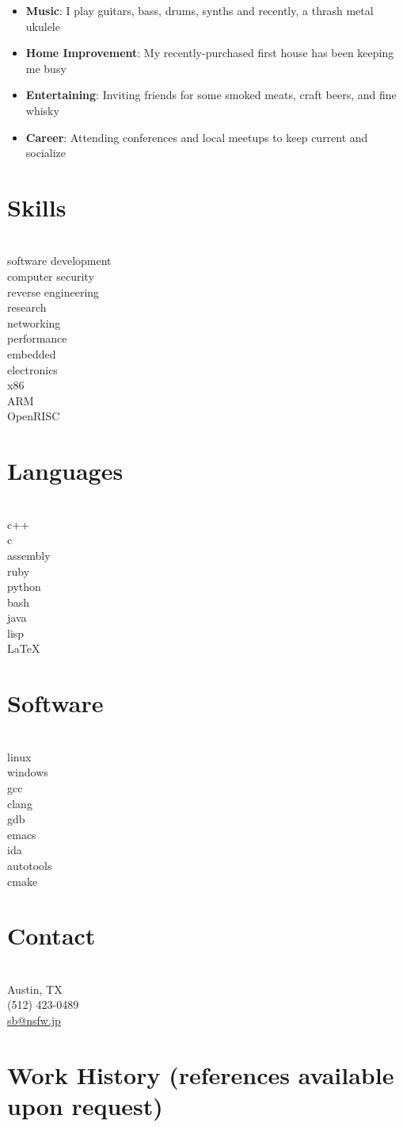 \documentclass[]{friggeri-cv}
\makeatletter
\newcommand{\bulletitems}{
  \section{Skills}\\
  \vspace{0.2cm}
  software development\\
  computer security\\
  reverse engineering\\
  research\\
  networking\\
  performance\\
  embedded\\
  electronics\\
  x86\\
  ARM\\
  OpenRISC\\
  \section{Languages}\\
  \vspace{0.2cm}
  c++\\
  c\\
  assembly\\
  ruby\\
  python\\
  bash\\
  java\\
  lisp\\
  \LaTeX\\
  \section{Software}\\
  \vspace{0.2cm}
  linux\\
  windows\\
  gcc\\
  clang\\
  gdb\\
  emacs\\
  ida\\
  autotools\\
  cmake\\
  \section{Contact}\\
  \vspace{0.2cm}
  Austin, TX\\
  (512) 423-0489\\
  \href{mailto:sb@nsfw.jp}{sb@nsfw.jp}\\
}
\newcommand{\sidebar}{
  \begin{aside}
  \bulletitems
  \end{aside}
}
\makeatother
\begin{document}
\begin{itemize}
\item{\textbf{Music}: I play guitars, bass, drums, synths and recently, a thrash metal ukulele}
\item{\textbf{Home Improvement}: My recently-purchased first house has been keeping me busy}
\item{\textbf{Entertaining}: Inviting friends for some smoked meats, craft
  beers, and fine whisky}
\item{\textbf{Career}: Attending conferences and local meetups to keep current
  and socialize}
\end{itemize}

\newpage

\sidebar

\section{Work History \hfill {\footnotesize{}(references available upon request)}}
\end{document}
